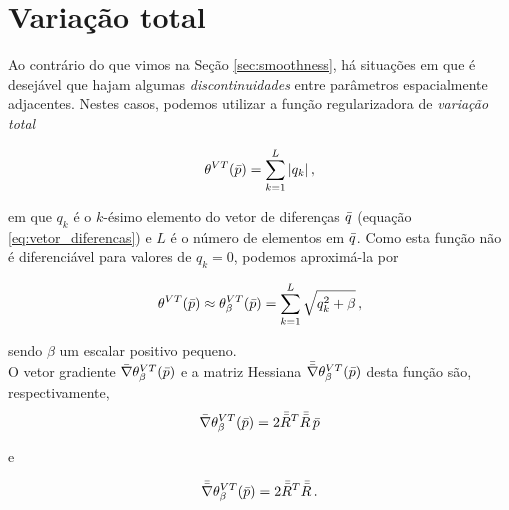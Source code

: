 \section{Variação total}

Ao contrário do que vimos na Seção \ref{sec:smoothness}, há situações em que é
desejável que hajam algumas {\it discontinuidades} entre parâmetros espacialmente
adjacentes. Nestes casos, podemos utilizar a função regularizadora de
{\it variação total}

\begin{equation}
\theta^{VT}(\bar{p}) = \sum\limits_{k=1}^L |q_k| \thinspace ,
\end{equation}

\noindent em que $q_k$ é o $k$-ésimo elemento do vetor de diferenças $\bar{q}$
(equação \ref{eq:vetor_diferencas}) e $L$ é o número de elementos em $\bar{q}$.
Como esta função não é diferenciável para valores de $q_k = 0$, podemos
aproximá-la por

\begin{equation}
\theta^{VT}(\bar{p}) \approx \theta^{VT}_\beta(\bar{p}) =
    \sum\limits_{k=1}^L \sqrt{q_k^2 + \beta} \thinspace ,
\end{equation}

\noindent sendo $\beta$ um escalar positivo pequeno.
\\
\indent O vetor gradiente $\bar{\nabla}\theta^{VT}_\beta(\bar{p})$ e a matriz
Hessiana $\bar{\bar{\nabla}}\theta^{VT}_\beta(\bar{p})$ desta função
\citep{martins_etal2011} são, respectivamente,
\begin{equation}
\bar{\nabla}\theta^{VT}_\beta(\bar{p}) = 2\bar{\bar{R}}^T \bar{\bar{R}}\thinspace\bar{p}
\end{equation}

\noindent e

\begin{equation}
\bar{\bar{\nabla}}\theta^{VT}_\beta(\bar{p}) = 2\bar{\bar{R}}^T \bar{\bar{R}} \thinspace .
\end{equation}
